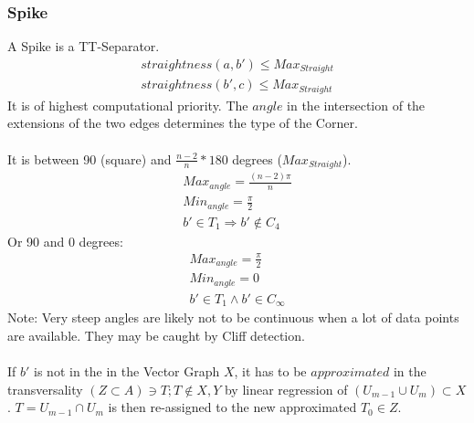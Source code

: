 \documentclass{report}
\begin{document}
\subsubsection{Spike}
A Spike is a TT-Separator.
\begin{align}
straightness(a,b')\leq Max_{Straight}\\ straightness(b',c)\leq Max_{Straight}
\end{align}
It is of highest computational priority. The $angle$ in the intersection of the extensions of the two edges determines the type of the Corner.\\\\
It is between 90 (square) and $\frac{n-2}{n}*180$ degrees ($Max_{Straight}$).
\begin{align}
Max_{angle}=\frac{(n-2)\pi}{n}\\
Min_{angle}=\frac{\pi}{2}\\
b' \in T_{1} \Rightarrow b' \not\in C_{4}
\end{align}
Or 90 and 0 degrees:
\begin{align}
Max_{angle}=\frac{\pi}{2}\\
Min_{angle}=0\\
b' \in T_{1} \land b' \in C_{\infty}
\end{align}
Note: Very steep angles are likely not to be continuous when a lot of data points are available. They may be caught by Cliff detection.\\\\
If $b'$ is not in the in the Vector Graph $X$, it has to be $approximated$ in the transversality $(Z \subset A) \ni T; T \notin X,Y$ by linear regression of $(U_{m-1}\cup U_{m})\subset X$. $T=U_{m-1}\cap U_{m}$ is then re-assigned to the new approximated $T_{0}\in Z$.
\end{document}
